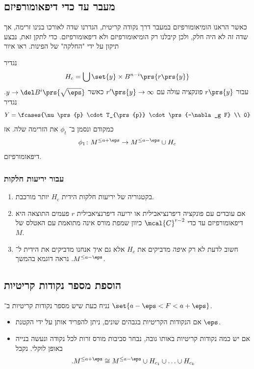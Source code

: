 \documentclass[a4paper,10pt,twoside,openany]{book}
\begin{document}
\subsection{מעבר עד כדי דיפאומורפיזם}

כאשר הראנו הומיאומורפיזם במעבר דרך נקודה קריטית, הגדרנו שדה לאורכו בנינו זרימה, אך שדה זה  לא היה חלק, ולכן קיבלנו רק הומיאומורפיזם ולא דיפאומורפיזם.
כדי לתקן זאת, נבצע תיקון על ידי "החלקה" של הפינות. ראו איור

נגדיר
\[H_c = \bigcup \set{y} \times B^{n-i}\prs{r\prs{y}}\]
עבור
$r\prs{y}$
פונקציה עולה עם
$r'\prs{y} \to \infty$
כאשר
$y \to \del B^i\prs{\sqrt{\eps}}$.
נגדיר
\[Y = \fcases{\nu\prs{p} \cdot T_{\prs{p}} \cdot \prs{-\nabla_g F} \\ 0}\]
כמקודם ונסמן ב־%
$\phi_t$
את הזרימה שלה.
אז
\[\phi_1 \colon M^{\leq a + \eps} \to M^{\leq a - \eps} \cup H_c\]
דיפאומורפיזם.

\subsubsection{עבור יריעות חלקות}

\begin{enumerate}
\item בקטגוריה של יריעות חלקות הידית
$H_c$
יותר מורכבת.
\item
 אם עובדים עם פונקציה דיפרנציאבילית או יריעה דיפרנציאבילית
$r$
פעמים התוצאה היא דיפאומורפיזם עד כדי
$\mcal{C}^{r-2}$
כיוון שמפת מורס אינה מתואמת עם האטלס של
$M$.
\item
חשוב לדעת לא רק
\emph{איפה}
מדביקים את
$H_c$
אלא גם
\emph{איך}
אנחנו מדביקים את הידית ל־%
$M^{\leq a - \eps}$.
נראה דוגמא בהמשך.
\end{enumerate}

\subsection{הוספת מספר נקודות קריטיות}

נניח כעת שיש מספר נקודות קריטיות ב־%
$\set{a - \eps < F < a + \eps}$.
\begin{itemize}
\item אם הנקודות הקריטיות בגבהים שונים, ניתן להפריד אותן על ידי הקטנת
$\eps$.
\item אם יש כמה נקודות קריטיות באותו גובה, נבחר סביבות מורס זרות לכל נקודה ונעשה בנייה באופן לוקלי. נקבל
\[\text{.} M^{\leq a + \eps} \cong M^{\leq a - \eps} \cup H_{c_1} \cup \ldots \cup H_{c_k}\]
\end{itemize}
\end{document}
